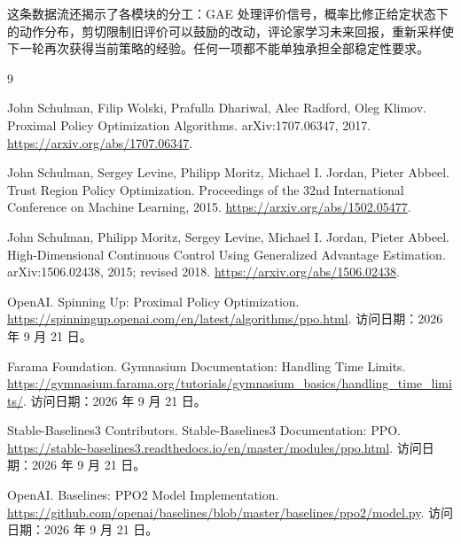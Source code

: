 \documentclass[UTF8,12pt,a4paper,fontset=fandol]{ctexart}
\begin{document}
这条数据流还揭示了各模块的分工：GAE 处理评价信号，概率比修正给定状态下的动作分布，剪切限制旧评价可以鼓励的改动，评论家学习未来回报，重新采样使下一轮再次获得当前策略的经验。任何一项都不能单独承担全部稳定性要求。

\begin{thebibliography}{9}

John Schulman, Filip Wolski, Prafulla Dhariwal, Alec Radford, Oleg Klimov.
\newblock Proximal Policy Optimization Algorithms.
\newblock arXiv:1707.06347, 2017.
\newblock \url{https://arxiv.org/abs/1707.06347}.

John Schulman, Sergey Levine, Philipp Moritz, Michael I. Jordan, Pieter Abbeel.
\newblock Trust Region Policy Optimization.
\newblock Proceedings of the 32nd International Conference on Machine Learning, 2015.
\newblock \url{https://arxiv.org/abs/1502.05477}.

John Schulman, Philipp Moritz, Sergey Levine, Michael I. Jordan, Pieter Abbeel.
\newblock High-Dimensional Continuous Control Using Generalized Advantage Estimation.
\newblock arXiv:1506.02438, 2015; revised 2018.
\newblock \url{https://arxiv.org/abs/1506.02438}.

OpenAI.
\newblock Spinning Up: Proximal Policy Optimization.
\newblock \url{https://spinningup.openai.com/en/latest/algorithms/ppo.html}.
\newblock 访问日期：2026 年 9 月 21 日。

Farama Foundation.
\newblock Gymnasium Documentation: Handling Time Limits.
\newblock \url{https://gymnasium.farama.org/tutorials/gymnasium_basics/handling_time_limits/}.
\newblock 访问日期：2026 年 9 月 21 日。

Stable-Baselines3 Contributors.
\newblock Stable-Baselines3 Documentation: PPO.
\newblock \url{https://stable-baselines3.readthedocs.io/en/master/modules/ppo.html}.
\newblock 访问日期：2026 年 9 月 21 日。

OpenAI.
\newblock Baselines: PPO2 Model Implementation.
\newblock \url{https://github.com/openai/baselines/blob/master/baselines/ppo2/model.py}.
\newblock 访问日期：2026 年 9 月 21 日。

\end{thebibliography}
\end{document}

